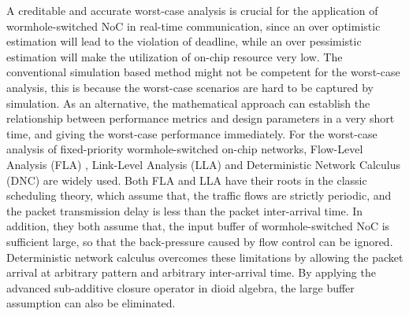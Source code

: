 \documentclass[10pt,journal]{IEEEtran}
\begin{document}
A creditable and accurate worst-case analysis is crucial for the application of wormhole-switched NoC in real-time communication, since an over optimistic estimation will lead to the violation of deadline, while an over pessimistic estimation will make the utilization of on-chip resource very low. The conventional simulation based method might not be competent for the worst-case analysis, this is because the worst-case scenarios are hard to be captured by simulation. As an alternative, the mathematical approach can establish the relationship between performance metrics and design parameters in a very short time, and giving the worst-case performance immediately. For the worst-case analysis of fixed-priority wormhole-switched on-chip networks, Flow-Level Analysis (FLA) \cite{Shi:2008:RCA:1397757.1397996}, Link-Level Analysis (LLA) \cite{73}\cite{189} and Deterministic Network Calculus (DNC) \cite{Qian489900} are widely used. Both FLA and LLA have their roots in the classic scheduling theory, which assume that, the traffic flows are strictly periodic, and the packet transmission delay is less than the packet inter-arrival time. In addition, they both assume that, the input buffer of wormhole-switched NoC is sufficient large, so that the back-pressure caused by flow control can be ignored. Deterministic network calculus overcomes these limitations by allowing the packet arrival at arbitrary pattern and arbitrary inter-arrival time. By applying the advanced sub-additive closure operator in dioid algebra, the large buffer assumption can also be eliminated.
\end{document}
